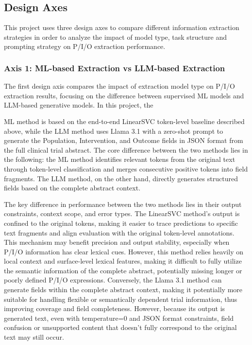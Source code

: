 \documentclass{article}
\begin{document}
\subsection{Design Axes}
This project uses three design axes to compare different information extraction strategies in order to analyze the impact of model type, task structure and prompting strategy on P/I/O extraction performance.

\subsubsection{Axis 1: ML-based Extraction vs LLM-based Extraction}
The first design axis compares the impact of extraction model type on P/I/O extraction results, focusing on the difference between supervised ML models and LLM-based generative models. In this project, the

ML method is based on the end-to-end LinearSVC token-level baseline described above, while the LLM method uses Llama 3.1 with a zero-shot prompt to generate the Population, Intervention, and Outcome fields in JSON format from the full clinical trial abstract. The core difference between the two methods lies in the following: the ML method identifies relevant tokens from the original text through token-level classification and merges consecutive positive tokens into field fragments. The LLM method, on the other hand, directly generates structured fields based on the complete abstract context.


The key difference in performance between the two methods lies in their output constraints, context scope, and error types. The LinearSVC method’s output is confined to the original tokens, making it easier to trace predictions to specific text fragments and align evaluation with the original token-level annotations. This mechanism may benefit precision and output stability, especially when P/I/O information has clear lexical cues. However, this method relies heavily on local context and surface-level lexical features, making it difficult to fully utilize the semantic information of the complete abstract, potentially missing longer or poorly defined P/I/O expressions. Conversely, the Llama 3.1 method can generate fields within the complete abstract context, making it potentially more suitable for handling flexible or semantically dependent trial information, thus improving coverage and field completeness. However, because its output is generated text, even with temperature=0 and JSON format constraints, field confusion or unsupported content that doesn’t fully correspond to the original text may still occur.
\end{document}
